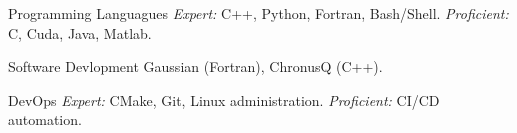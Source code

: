 


\begin{cvskills}


%
%


\cvskill
{Programming Languagues} %
{\textit{Expert:} C++, Python, Fortran, Bash/Shell. \textit{Proficient:} C, Cuda, Java, Matlab.} %

\cvskill
{Software Devlopment} %
{Gaussian (Fortran), ChronusQ (C++).}


\cvskill
{DevOps} %
{\textit{Expert:} CMake, Git, Linux administration. \textit{Proficient:} CI/CD automation.}


\end{cvskills}
